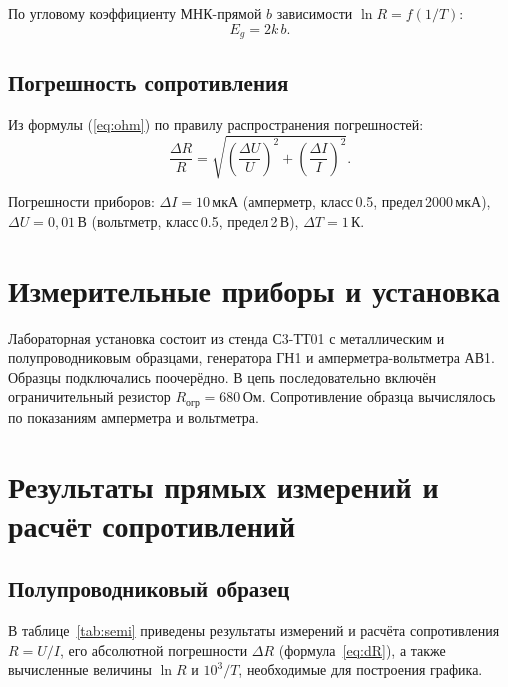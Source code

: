 \documentclass[a4paper,14pt]{article}
\begin{document}
По угловому коэффициенту МНК-прямой $b$ зависимости $\ln R = f(1/T)$:
\begin{equation}
    E_g = 2k\,b.
    \label{eq:Eg_mnk}
\end{equation}

\subsection*{Погрешность сопротивления}

Из формулы (\ref{eq:ohm}) по правилу распространения погрешностей:
\begin{equation}
    \frac{\Delta R}{R} = \sqrt{\left(\frac{\Delta U}{U}\right)^2 + \left(\frac{\Delta I}{I}\right)^2}.
    \label{eq:dR}
\end{equation}

Погрешности приборов: $\Delta I = 10$\,мкА (амперметр, класс\,0.5, предел\,2000\,мкА),
$\Delta U = 0{,}01$\,В (вольтметр, класс\,0.5, предел\,2\,В), $\Delta T = 1$\,К.

\section{Измерительные приборы и установка}

Лабораторная установка состоит из стенда С3-ТТ01 с металлическим и полупроводниковым образцами, генератора ГН1 и амперметра-вольтметра АВ1. Образцы подключались поочерёдно. В цепь последовательно включён ограничительный резистор $R_\text{огр} = 680$\,Ом. Сопротивление образца вычислялось по показаниям амперметра и вольтметра.

\section{Результаты прямых измерений и расчёт сопротивлений}

\subsection{Полупроводниковый образец}

В таблице~\ref{tab:semi} приведены результаты измерений и расчёта сопротивления $R = U/I$, его абсолютной погрешности $\Delta R$ (формула~\ref{eq:dR}), а также вычисленные величины $\ln R$ и $10^3/T$, необходимые для построения графика.
\end{document}
